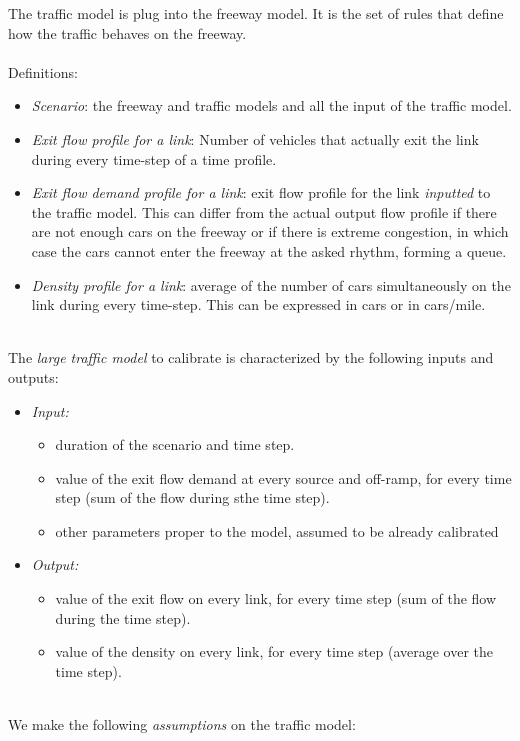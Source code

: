 The traffic model is plug into the freeway model. It is the set of rules that define how the traffic behaves on the freeway.\\
\\
Definitions:
\begin{itemize}	
	\item \emph{Scenario}: the freeway and traffic models and all the input of the traffic model.
	\item \emph{Exit flow profile for a link}: Number of vehicles that actually exit the link during every time-step of a time profile.
	\item \emph{Exit flow demand profile for a link}: exit flow profile for the link \emph{inputted} to the traffic model. This can differ from the actual output flow profile if there are not enough cars on the freeway or if there is extreme congestion, in which case the cars cannot enter the freeway at the asked rhythm, forming a queue.
	\item \emph{Density profile for a link}: average of the number of cars simultaneously on the link during every time-step. This can be expressed in cars or in cars/mile.
\end{itemize}
~\\
The \emph{large traffic model} to calibrate is characterized by the following inputs and outputs:
\begin{itemize}
	\item \emph{Input:} 
	\begin{itemize}
		\item   duration of the scenario and time step.
		\item   value of the exit flow demand at every source and off-ramp, for every time step (sum of the flow during sthe time step).
		\item	other parameters proper to the model, assumed to be already calibrated
	\end{itemize}
	\item \emph{Output:}
	\begin{itemize}
		\item   value of the exit flow on every link, for every time step (sum of the flow during the time step).
		\item	value of the density on every link, for every time step (average over the time step).		
	\end{itemize}
\end{itemize}
~\\
We make the following \emph{assumptions} on the traffic model: 
